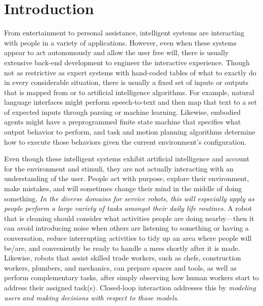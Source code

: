 \documentclass[letterpaper]{article} %
\begin{document}
\section{Introduction\label{sec:intro}}
From entertainment to personal assistance, intelligent systems are interacting with people in a variety of applications.  However, even when these systems appear to act autonomously and allow the user free will, there is usually extensive back-end development to engineer the interactive experience.  Though not as restrictive as expert systems with hand-coded tables of what to exactly do in every considerable situation, there is usually a fixed set of inputs or outputs that is mapped from or to artificial intelligence algorithms.  For example, natural language interfaces might perform speech-to-text and then map that text to a set of expected inputs through parsing or machine learning.  Likewise, embodied agents might have a preprogrammed finite state machine that specifies what output behavior to perform, and task and motion planning algorithms determine how to execute those behaviors given the current environment's configuration.

Even though these intelligent systems exhibit artificial intelligence and account for the environment and stimuli, they are not actually interacting with an understanding of the user.  People act with purpose, explore their environment, make mistakes, and will sometimes change their mind in the middle of doing something.  \textit{In the diverse domains for service robots, this will especially apply as people perform a large variety of tasks amongst their daily life routines}.  A robot that is cleaning should consider what activities people are doing nearby---then it can avoid introducing noise when others are listening to something or having a conversation, reduce interrupting activities to tidy up an area where people will be/are, and conveniently be ready to handle a mess shortly after it is made.  Likewise, robots that assist skilled trade workers, such as chefs, construction workers, plumbers, and mechanics, can prepare spaces and tools, as well as perform complementary tasks, after simply observing how human workers start to address their assigned task(s).  Closed-loop interaction addresses this by \textit{modeling users and making decisions with respect to those models}.
\end{document}
